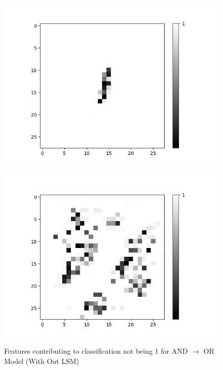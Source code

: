 	

		\begin{figure}[H]
		\centering
		\begin{minipage}[b]{0.19\textwidth}
			\captionsetup{labelformat=empty}
			\includegraphics[width=\textwidth]{AND-OR(W-LSM)(1)/Like/True/Layer0-Neuron-9.png}
			\label{}
		\end{minipage}
		
		\medskip
		
		\begin{minipage}[b]{0.19\textwidth}
			\captionsetup{labelformat=empty}
			\includegraphics[width=\textwidth]{AND-OR(W-LSM)(1)/Like/False/Layer0-Neuron-9.png}
			\label{}
		\end{minipage}
		\caption{Features contributing to classification not being 1 for AND $\rightarrow$ OR Model (With Out LSM)}
		\label{fig:and-or-lnn-with-lsm-like}
		\hfill
	\end{figure}


